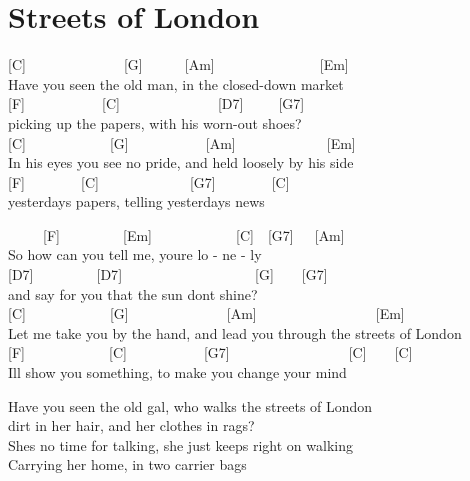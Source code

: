 \documentclass[
  letterpaper,
  twoside=false]{scrbook}
\begin{document}
\hypertarget{streets-of-london}{%
\chapter{Streets of London}\label{streets-of-london}}

{[}C{]}~~~~~~~~~~~~~~{[}G{]}~~~~~~{[}Am{]}~~~~~~~~~~~~~~~{[}Em{]}\\
Have you seen the old man, in the closed-down market\\
{[}F{]}~~~~~~~~~~~{[}C{]}~~~~~~~~~~~~~~{[}D7{]}~~~~~{[}G7{]}\\
picking up the papers, with his worn-out shoes?\\
{[}C{]}~~~~~~~~~~~~{[}G{]}~~~~~~~~~~~{[}Am{]}~~~~~~~~~~~~~{[}Em{]}\\
In his eyes you see no pride, and held loosely by his side\\
{[}F{]}~~~~~~~~{[}C{]}~~~~~~~~~~~~~{[}G7{]}~~~~~~~~{[}C{]}\\
yesterday\textquotesingle s papers, telling yesterday\textquotesingle s
news

~~~~~{[}F{]}~~~~~~~~~{[}Em{]}~~~~~~~~~~~~{[}C{]}~~{[}G7{]}~~~{[}Am{]}\\
\hspace*{0.333em}\hspace*{0.333em}\hspace*{0.333em}\hspace*{0.333em}So
how can you tell me, you\textquotesingle re lo - ne - ly\\
{[}D7{]}~~~~~~~~~{[}D7{]}~~~~~~~~~~~~~~~~~~~{[}G{]}~~~~{[}G7{]}\\
\hspace*{0.333em}\hspace*{0.333em}and say for you that the sun
don\textquotesingle t shine?\\
{[}C{]}~~~~~~~~~~~~{[}G{]}~~~~~~~~~~~~~~{[}Am{]}~~~~~~~~~~~~~~~~~{[}Em{]}\\
Let me take you by the hand, and lead you through the streets of
London\\
{[}F{]}~~~~~~~~~~~~{[}C{]}~~~~~~~~~~~{[}G7{]}~~~~~~~~~~~~~~~~~{[}C{]}~~~~{[}C{]}\\
\hspace*{0.333em}\hspace*{0.333em}I\textquotesingle ll show you
something, to make you change your mind

Have you seen the old gal, who walks the streets of London\\
dirt in her hair, and her clothes in rags?\\
She\textquotesingle s no time for talking, she just keeps right on
walking\\
Carrying her home, in two carrier bags
\end{document}
